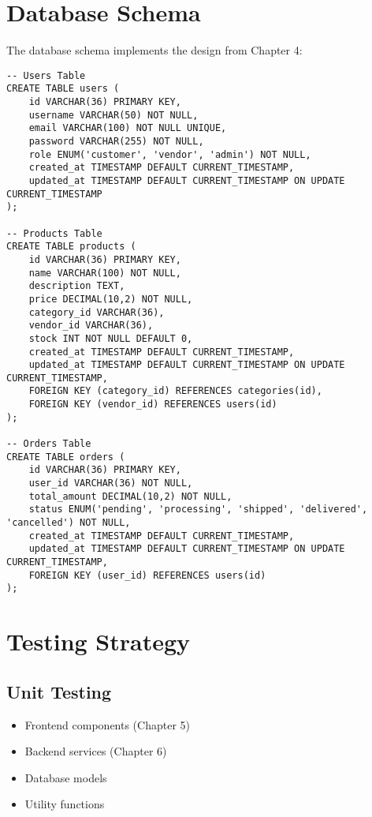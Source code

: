 \section{Database Schema}
The database schema implements the design from Chapter 4:

\begin{verbatim}
-- Users Table
CREATE TABLE users (
    id VARCHAR(36) PRIMARY KEY,
    username VARCHAR(50) NOT NULL,
    email VARCHAR(100) NOT NULL UNIQUE,
    password VARCHAR(255) NOT NULL,
    role ENUM('customer', 'vendor', 'admin') NOT NULL,
    created_at TIMESTAMP DEFAULT CURRENT_TIMESTAMP,
    updated_at TIMESTAMP DEFAULT CURRENT_TIMESTAMP ON UPDATE CURRENT_TIMESTAMP
);

-- Products Table
CREATE TABLE products (
    id VARCHAR(36) PRIMARY KEY,
    name VARCHAR(100) NOT NULL,
    description TEXT,
    price DECIMAL(10,2) NOT NULL,
    category_id VARCHAR(36),
    vendor_id VARCHAR(36),
    stock INT NOT NULL DEFAULT 0,
    created_at TIMESTAMP DEFAULT CURRENT_TIMESTAMP,
    updated_at TIMESTAMP DEFAULT CURRENT_TIMESTAMP ON UPDATE CURRENT_TIMESTAMP,
    FOREIGN KEY (category_id) REFERENCES categories(id),
    FOREIGN KEY (vendor_id) REFERENCES users(id)
);

-- Orders Table
CREATE TABLE orders (
    id VARCHAR(36) PRIMARY KEY,
    user_id VARCHAR(36) NOT NULL,
    total_amount DECIMAL(10,2) NOT NULL,
    status ENUM('pending', 'processing', 'shipped', 'delivered', 'cancelled') NOT NULL,
    created_at TIMESTAMP DEFAULT CURRENT_TIMESTAMP,
    updated_at TIMESTAMP DEFAULT CURRENT_TIMESTAMP ON UPDATE CURRENT_TIMESTAMP,
    FOREIGN KEY (user_id) REFERENCES users(id)
);
\end{verbatim}

\section{Testing Strategy}
\subsection{Unit Testing}
\begin{itemize}
    \item Frontend components (Chapter 5)
    \item Backend services (Chapter 6)
    \item Database models
    \item Utility functions
\end{itemize}

